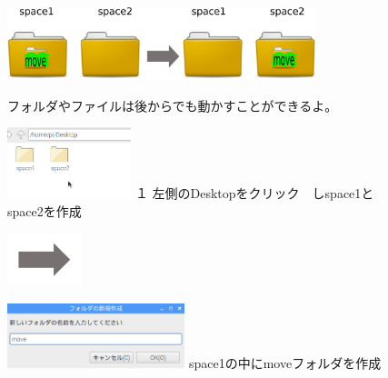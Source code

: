 \documentclass[a4paper,12pt]{jarticle}
\begin{document}
\begin{figure}[ht]
  \centering
  \includegraphics[width=0.8\textwidth]{fig15-1.eps}
  \begin{minipage}{15.297cm}
    フォルダやファイルは後からでも動かすことができるよ。
  \end{minipage}

  \begin{minipage}{5.963cm}
    \includegraphics[width=3.604cm]{textbook-img051.png}
    {\flushleft
      １
      左側のDesktopをクリック　しspace1とspace2を作成
    }
  \end{minipage}
  \includegraphics[width=2.168cm]{textbook-img052.png}
  \begin{minipage}{7.473cm}
    \includegraphics[width=5.166cm]{textbook-img050.png}
    { space1の中にmoveフォルダを作成
    }
  \end{minipage}


\end{figure}
\end{document}
